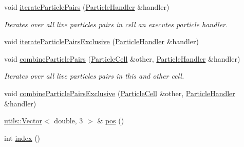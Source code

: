 \begin{DoxyCompactItemize}
void \hyperlink{classSimulation_1_1ParticleCell_af8598bbf4f16c78024b3cbfbcd82f840}{iterate\-Particle\-Pairs} (\hyperlink{classSimulation_1_1ParticleHandler}{Particle\-Handler} \&handler)
\begin{DoxyCompactList}\small\item\em Iterates over all live particles pairs in cell an executes particle handler. \end{DoxyCompactList}\item 
void \hyperlink{classSimulation_1_1ParticleCell_aeb6f2c822b074287ee326601620cb976}{iterate\-Particle\-Pairs\-Exclusive} (\hyperlink{classSimulation_1_1ParticleHandler}{Particle\-Handler} \&handler)
\item 
void \hyperlink{classSimulation_1_1ParticleCell_a085607f34528b0fcf3b957792316305e}{combine\-Particle\-Pairs} (\hyperlink{classSimulation_1_1ParticleCell}{Particle\-Cell} \&other, \hyperlink{classSimulation_1_1ParticleHandler}{Particle\-Handler} \&handler)
\begin{DoxyCompactList}\small\item\em Iterates over all live particles pairs in this and other cell. \end{DoxyCompactList}\item 
void \hyperlink{classSimulation_1_1ParticleCell_a549a864549fe46ac551074f056a6805e}{combine\-Particle\-Pairs\-Exclusive} (\hyperlink{classSimulation_1_1ParticleCell}{Particle\-Cell} \&other, \hyperlink{classSimulation_1_1ParticleHandler}{Particle\-Handler} \&handler)
\item 
\hyperlink{classutils_1_1Vector}{utils\-::\-Vector}$<$ double, 3 $>$ \& \hyperlink{classSimulation_1_1ParticleCell_a4bb88bb8f5196cf9ad558f304fe33404}{pos} ()
\item 
int \hyperlink{classSimulation_1_1ParticleCell_ab05253d30f6451bc6af50d5293a4def1}{index} ()
\end{DoxyCompactItemize}
